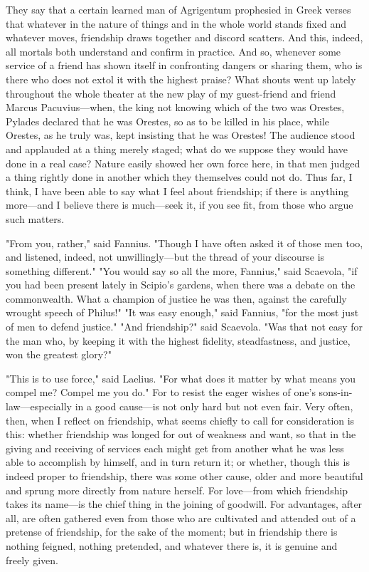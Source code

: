 They say that a certain learned man of Agrigentum prophesied in Greek verses that whatever in the nature of things and in the whole world stands fixed and whatever moves, friendship draws together and discord scatters. And this, indeed, all mortals both understand and confirm in practice. And so, whenever some service of a friend has shown itself in confronting dangers or sharing them, who is there who does not extol it with the highest praise? What shouts went up lately throughout the whole theater at the new play of my guest-friend and friend Marcus Pacuvius—when, the king not knowing which of the two was Orestes, Pylades declared that he was Orestes, so as to be killed in his place, while Orestes, as he truly was, kept insisting that he was Orestes! The audience stood and applauded at a thing merely staged; what do we suppose they would have done in a real case? Nature easily showed her own force here, in that men judged a thing rightly done in another which they themselves could not do. Thus far, I think, I have been able to say what I feel about friendship; if there is anything more—and I believe there is much—seek it, if you see fit, from those who argue such matters.

 "From you, rather," said Fannius. "Though I have often asked it of those men too, and listened, indeed, not unwillingly—but the thread of your discourse is something different." "You would say so all the more, Fannius," said Scaevola, "if you had been present lately in Scipio's gardens, when there was a debate on the commonwealth. What a champion of justice he was then, against the carefully wrought speech of Philus!" "It was easy enough," said Fannius, "for the most just of men to defend justice." "And friendship?" said Scaevola. "Was that not easy for the man who, by keeping it with the highest fidelity, steadfastness, and justice, won the greatest glory?"

 "This is to use force," said Laelius. "For what does it matter by what means you compel me? Compel me you do." For to resist the eager wishes of one's sons-in-law—especially in a good cause—is not only hard but not even fair. Very often, then, when I reflect on friendship, what seems chiefly to call for consideration is this: whether friendship was longed for out of weakness and want, so that in the giving and receiving of services each might get from another what he was less able to accomplish by himself, and in turn return it; or whether, though this is indeed proper to friendship, there was some other cause, older and more beautiful and sprung more directly from nature herself. For love—from which friendship takes its name—is the chief thing in the joining of goodwill. For advantages, after all, are often gathered even from those who are cultivated and attended out of a pretense of friendship, for the sake of the moment; but in friendship there is nothing feigned, nothing pretended, and whatever there is, it is genuine and freely given.

